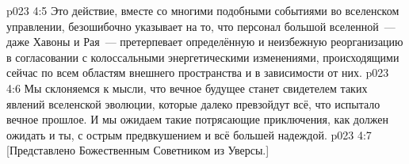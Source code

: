 \vs p023 4:5 \pc Это действие, вместе со многими подобными событиями во вселенском управлении, безошибочно указывает на то, что персонал большой вселенной~--- даже Хавоны и Рая~--- претерпевает определённую и неизбежную реорганизацию в согласовании с колоссальными энергетическими изменениями, происходящими сейчас по всем областям внешнего пространства и в зависимости от них.
\vs p023 4:6 Мы склоняемся к мысли, что вечное будущее станет свидетелем таких явлений вселенской эволюции, которые далеко превзойдут всё, что испытало вечное прошлое. И мы ожидаем такие потрясающие приключения, как должен ожидать и ты, с острым предвкушением и всё большей надеждой.
\vsetoff
\vs p023 4:7 [Представлено Божественным Советником из Уверсы.]
\quizlink
